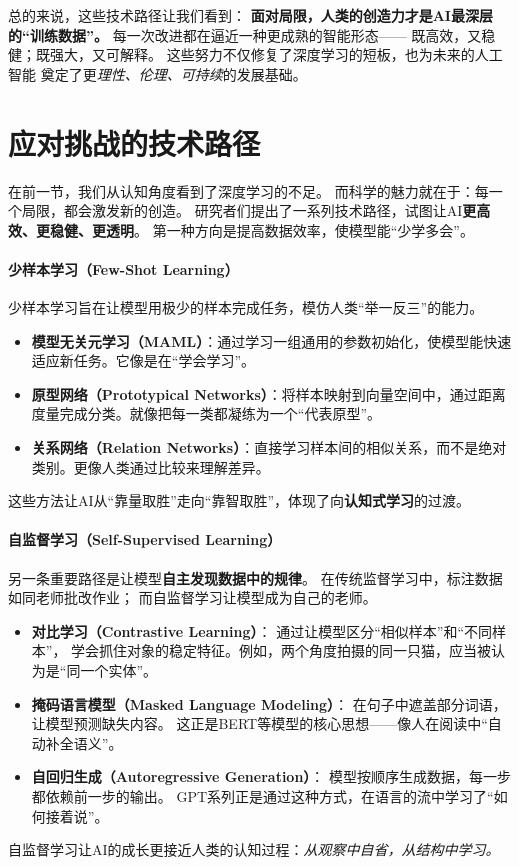 总的来说，这些技术路径让我们看到：  
\textbf{面对局限，人类的创造力才是AI最深层的“训练数据”。}  
每一次改进都在逼近一种更成熟的智能形态——  
既高效，又稳健；既强大，又可解释。  
这些努力不仅修复了深度学习的短板，也为未来的人工智能  
奠定了更\textit{理性、伦理、可持续}的发展基础。

\section{应对挑战的技术路径}

在前一节，我们从认知角度看到了深度学习的不足。  
而科学的魅力就在于：每一个局限，都会激发新的创造。  
研究者们提出了一系列技术路径，试图让AI\textbf{更高效、更稳健、更透明}。  
第一种方向是提高数据效率，使模型能“少学多会”。

\paragraph{少样本学习（Few-Shot Learning）}  
少样本学习旨在让模型用极少的样本完成任务，模仿人类“举一反三”的能力。  
\begin{itemize}
\item \textbf{模型无关元学习（MAML）}：通过学习一组通用的参数初始化，使模型能快速适应新任务。它像是在“学会学习”。  
\item \textbf{原型网络（Prototypical Networks）}：将样本映射到向量空间中，通过距离度量完成分类。就像把每一类都凝练为一个“代表原型”。  
\item \textbf{关系网络（Relation Networks）}：直接学习样本间的相似关系，而不是绝对类别。更像人类通过比较来理解差异。  
\end{itemize}
这些方法让AI从“靠量取胜”走向“靠智取胜”，体现了向\textbf{认知式学习}的过渡。

\paragraph{自监督学习（Self-Supervised Learning）}  
另一条重要路径是让模型\textbf{自主发现数据中的规律}。  
在传统监督学习中，标注数据如同老师批改作业；  
而自监督学习让模型成为自己的老师。  

\begin{itemize}
\item \textbf{对比学习（Contrastive Learning）}：  
  通过让模型区分“相似样本”和“不同样本”，  
  学会抓住对象的稳定特征。例如，两个角度拍摄的同一只猫，应当被认为是“同一个实体”。  

\item \textbf{掩码语言模型（Masked Language Modeling）}：  
  在句子中遮盖部分词语，让模型预测缺失内容。  
  这正是BERT等模型的核心思想——像人在阅读中“自动补全语义”。  

\item \textbf{自回归生成（Autoregressive Generation）}：  
  模型按顺序生成数据，每一步都依赖前一步的输出。  
  GPT系列正是通过这种方式，在语言的流中学习了“如何接着说”。  
\end{itemize}
自监督学习让AI的成长更接近人类的认知过程：\textit{从观察中自省，从结构中学习。}

